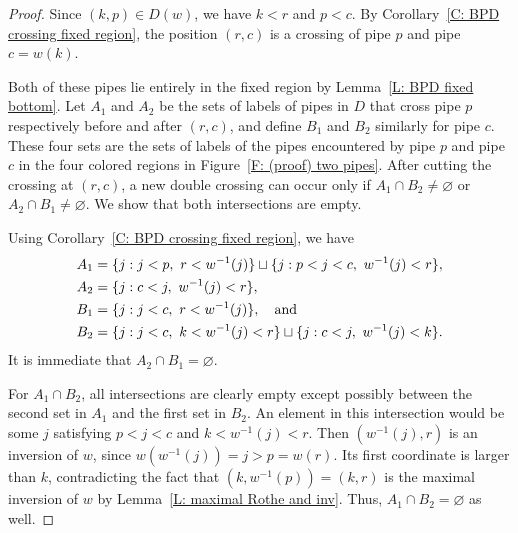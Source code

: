 \documentclass[10pt]{article}
\begin{document}
\begin{proof}
Since $(k,p)\in D(w)$, we have $k<r$ and $p<c$.
By Corollary~\ref{C: BPD crossing fixed region},
the position $(r,c)$ is a crossing of pipe $p$
and pipe $c=w(k)$.

Both of these pipes lie entirely in the fixed region
by Lemma~\ref{L: BPD fixed bottom}.
Let $A_1$ and $A_2$ be the sets of labels of pipes in $D$ that 
cross pipe $p$ respectively before and after $(r,c)$,
and define $B_1$ and $B_2$ similarly for pipe $c$.
These four sets are the sets of labels
of the pipes encountered by pipe $p$ and pipe $c$
in the four colored regions in Figure~\ref{F: (proof) two pipes}.
After cutting the crossing at $(r,c)$,
a new double crossing can occur only if
$A_1\cap B_2\neq\varnothing$ or
$A_2\cap B_1\neq\varnothing$.
We show that both intersections are empty.

Using Corollary~\ref{C: BPD crossing fixed region}, we have
\[
\begin{aligned}
A_1
&=
\{j:j<p,\ r<w^{-1}(j)\}
\sqcup
\{j:p<j<c,\ w^{-1}(j)<r\},
\\
A_2&=\{j:c<j,\ w^{-1}(j)<r\},
\\
B_1&=\{j:j<c,\ r<w^{-1}(j)\},\quad\text{and}\quad 
\\
B_2
&=
\{j:j<c,\ k<w^{-1}(j)<r\}
\sqcup
\{j:c<j,\ w^{-1}(j)<k\}.
\end{aligned}
\]
It is immediate that $A_2\cap B_1=\varnothing$.

For $A_1\cap B_2$, all intersections are clearly empty
except possibly between the second set in $A_1$
and the first set in $B_2$.
An element in this intersection would be some $j$ satisfying
$p<j<c$ and $k<w^{-1}(j)<r$.
Then $(w^{-1}(j),r)$ is an inversion of $w$,
since $w(w^{-1}(j))=j>p=w(r)$.
Its first coordinate is larger than $k$,
contradicting the fact that
$(k,w^{-1}(p))=(k,r)$ is the maximal inversion of $w$
by Lemma~\ref{L: maximal Rothe and inv}.
Thus, $A_1\cap B_2=\varnothing$ as well.
\end{proof}
\end{document}
